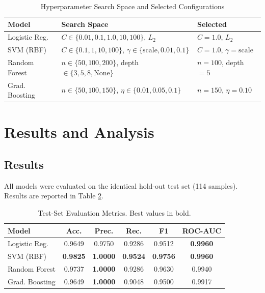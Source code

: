 \documentclass[conference,10pt]{IEEEtran}
\begin{document}
\begin{table}[htbp]
\caption{Hyperparameter Search Space and Selected Configurations}
\label{tab:params}
\centering
\begin{tabular}{lll}
\toprule
\textbf{Model} & \textbf{Search Space} & \textbf{Selected} \\
\midrule
Logistic Reg. & $C \in \{0.01, 0.1, 1.0, 10, 100\}$, $L_2$ & $C = 1.0$, $L_2$ \\
SVM (RBF) & $C \in \{0.1, 1, 10, 100\}$, $\gamma \in \{\text{scale}, 0.01, 0.1\}$ & $C = 1.0$, $\gamma = \text{scale}$ \\
Random Forest & $n \in \{50, 100, 200\}$, depth $\in \{3, 5, 8, \text{None}\}$ & $n = 100$, depth $= 5$ \\
Grad. Boosting & $n \in \{50, 100, 150\}$, $\eta \in \{0.01, 0.05, 0.1\}$ & $n = 150$, $\eta = 0.10$ \\
\bottomrule
\end{tabular}
\end{table}

\section{Results and Analysis}
\subsection{Results}
All models were evaluated on the identical hold-out test set (114 samples). Results are reported in Table \ref{tab:results}.

\begin{table}[htbp]
\caption{Test-Set Evaluation Metrics. Best values in bold.}
\label{tab:results}
\centering
\begin{tabular}{lccccc}
\toprule
\textbf{Model} & \textbf{Acc.} & \textbf{Prec.} & \textbf{Rec.} & \textbf{F1} & \textbf{ROC-AUC} \\
\midrule
Logistic Reg. & 0.9649 & 0.9750 & 0.9286 & 0.9512 & \textbf{0.9960} \\
SVM (RBF) & \textbf{0.9825} & \textbf{1.0000} & \textbf{0.9524} & \textbf{0.9756} & \textbf{0.9960} \\
Random Forest & 0.9737 & \textbf{1.0000} & 0.9286 & 0.9630 & 0.9940 \\
Grad. Boosting & 0.9649 & \textbf{1.0000} & 0.9048 & 0.9500 & 0.9917 \\
\bottomrule
\end{tabular}
\end{table}
\end{document}
